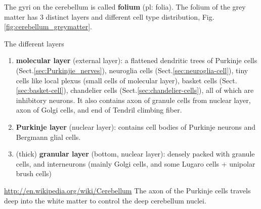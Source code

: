 The gyri on the cerebellum is called {\bf folium} (pl: folia). The folium of the
grey matter has 3 distinct layers and different cell type distribution,
Fig.\ref{fig:cerebellum_greymatter}.

The different layers
\begin{enumerate}
  
  \item {\bf molecular layer} (external layer): a flattened dendritic trees of
  Purkinje cells (Sect.\ref{sec:Purkinjie_nerves}), neuroglia cells
  (Sect.\ref{sec:neuroglia-cell}), tiny cells like local plexus (small cells of
  molecular layer), basket cells (Sect.\ref{sec:basket-cell}), chandelier cells
  (Sect.\ref{sec:chandelier-cells}), all of which are inhibitory neurons.
  It also contains axon of granule cells from nuclear layer, axon of Golgi
  cells, and end of Tendril climbing fiber.

  \item {\bf Purkinje layer} (nuclear layer): contains cell bodies of Purkinje
  neurons and Bergmann glial cells. 
  
  \item (thick) {\bf granular layer} (bottom, nuclear layer): densely packed
  with granule cells, and interneurons (mainly Golgi cells, and some Lugaro
  cells + unipolar brush cells)
\end{enumerate}
\url{http://en.wikipedia.org/wiki/Cerebellum}
The axon of the Purkinje cells travels deep into the white matter to control the
deep cerebellum nuclei.

